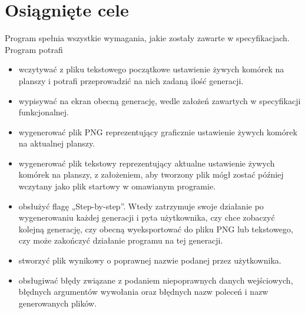 \documentclass[12pt]{report}
\begin{document}
\section{Osiągnięte cele}
Program spełnia wszystkie wymagania, jakie zostały zawarte w specyfikacjach. Program potrafi
\begin{itemize}
    \item wczytywać z pliku tekstowego początkowe ustawienie żywych komórek na planszy i potrafi przeprowadzić na nich zadaną ilość generacji.
    \item wypisywać na ekran obecną generację, wedle założeń zawartych w specyfikacji funkcjonalnej.
    \item wygenerować plik PNG reprezentujący graficznie ustawienie żywych komórek na aktualnej planszy.
    \item wygenerować plik tekstowy reprezentujący aktualne ustawienie żywych komórek na planszy, z założeniem, aby tworzony plik mógł zostać później wczytany jako plik startowy w omawianym programie.
    \item obsłużyć flagę „Step-by-step”. Wtedy zatrzymuje swoje działanie po wygenerowaniu każdej generacji i pyta użytkownika, czy chce zobaczyć kolejną generację, czy obecną wyeksportować do pliku PNG lub tekstowego, czy może zakończyć działanie programu na tej generacji.
    \item stworzyć plik wynikowy o poprawnej nazwie podanej przez użytkownika.
    \item obsługiwać błędy związane z podaniem niepoprawnych danych wejściowych, błędnych argumentów wywołania oraz błędnych nazw poleceń i nazw generowanych plików.
\end{itemize}
\end{document}
